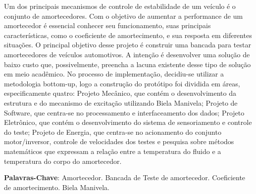 \begin{resumo}[Resumo]

Um dos principais mecanismos de controle de estabilidade de um veículo é o conjunto de amortecedores. Com o objetivo de aumentar a performance de um amortecedor é essencial conhecer seu funcionamento, suas principais características, como o coeficiente de amortecimento, e sua resposta em diferentes situações. O principal objetivo desse projeto é construir uma bancada para testar amortecedores de veículos automotivos. A intenção é desenvolver uma solução de baixo custo que, possivelmente, preencha a lacuna existente desse tipo de solução em meio acadêmico. No processo de implementação, decidiu-se utilizar a metodologia bottom-up, logo a construção do protótipo foi dividida em áreas, especificamente quatro: Projeto Mecânico, que contém o desenvolvimento da estrutura e do mecanismo de excitação utilizando Biela Manivela; Projeto de Software, que centra-se no processamento e interfaceamento dos dados; Projeto Eletrônico, que contém o desenvolvimento do sistema de sensoriamento e controle do teste; Projeto de Energia, que centra-se no acionamento do conjunto motor/inversor, controle de velocidades dos testes e pesquisa sobre métodos matemáticos que expressam a relação entre a temperatura do fluido e a temperatura do corpo do amortecedor.


   \vspace{\onelineskip}
 
   \noindent 
   
   \textbf{Palavras-Chave}: Amortecedor. Bancada de Teste de amortecedor. Coeficiente de amortecimento. Biela Manivela.

\end{resumo}
